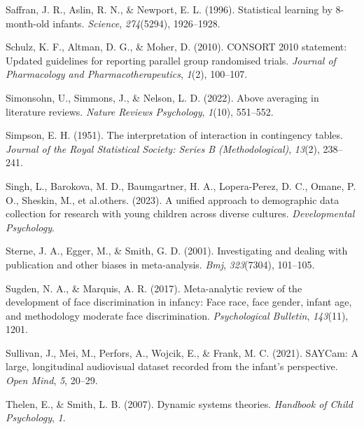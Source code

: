 \documentclass[
  man]{apa6}
\newlength{\cslhangindent}
\newlength{\cslentryspacingunit} %
\newenvironment{CSLReferences}[2] %
 {%
  \setlength{\parindent}{0pt}
  \ifodd #1
  \let\oldpar\par
  \def\par{\hangindent=\cslhangindent\oldpar}
  \fi
  \setlength{\parskip}{#2\cslentryspacingunit}
 }%
 {}
\begin{document}
\begin{CSLReferences}{1}{0}
\leavevmode{}%
Saffran, J. R., Aslin, R. N., \& Newport, E. L. (1996). Statistical learning by 8-month-old infants. \emph{Science}, \emph{274}(5294), 1926--1928.

\leavevmode{}%
Schulz, K. F., Altman, D. G., \& Moher, D. (2010). CONSORT 2010 statement: Updated guidelines for reporting parallel group randomised trials. \emph{Journal of Pharmacology and Pharmacotherapeutics}, \emph{1}(2), 100--107.

\leavevmode{}%
Simonsohn, U., Simmons, J., \& Nelson, L. D. (2022). Above averaging in literature reviews. \emph{Nature Reviews Psychology}, \emph{1}(10), 551--552.

\leavevmode{}%
Simpson, E. H. (1951). The interpretation of interaction in contingency tables. \emph{Journal of the Royal Statistical Society: Series B (Methodological)}, \emph{13}(2), 238--241.

\leavevmode{}%
Singh, L., Barokova, M. D., Baumgartner, H. A., Lopera-Perez, D. C., Omane, P. O., Sheskin, M., et al.others. (2023). A unified approach to demographic data collection for research with young children across diverse cultures. \emph{Developmental Psychology}.

\leavevmode{}%
Sterne, J. A., Egger, M., \& Smith, G. D. (2001). Investigating and dealing with publication and other biases in meta-analysis. \emph{Bmj}, \emph{323}(7304), 101--105.

\leavevmode{}%
Sugden, N. A., \& Marquis, A. R. (2017). Meta-analytic review of the development of face discrimination in infancy: Face race, face gender, infant age, and methodology moderate face discrimination. \emph{Psychological Bulletin}, \emph{143}(11), 1201.

\leavevmode{}%
Sullivan, J., Mei, M., Perfors, A., Wojcik, E., \& Frank, M. C. (2021). SAYCam: A large, longitudinal audiovisual dataset recorded from the infant's perspective. \emph{Open Mind}, \emph{5}, 20--29.

\leavevmode{}%
Thelen, E., \& Smith, L. B. (2007). Dynamic systems theories. \emph{Handbook of Child Psychology}, \emph{1}.


\end{CSLReferences}
\end{document}
